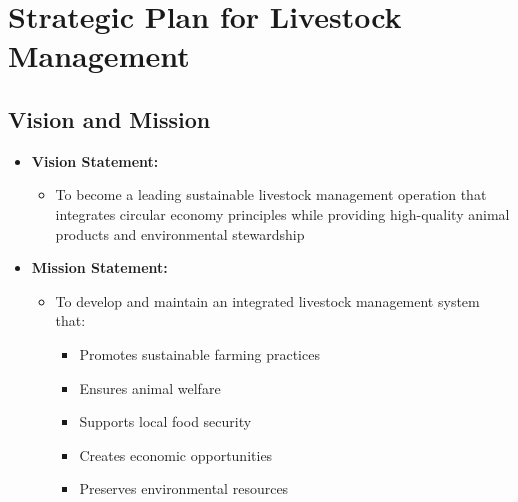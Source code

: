 \section{Strategic Plan for Livestock Management}

\subsection{Vision and Mission}
\begin{itemize}
    \item \textbf{Vision Statement:}
    \begin{itemize}
        \item To become a leading sustainable livestock management operation that integrates circular economy principles while providing high-quality animal products and environmental stewardship
    \end{itemize}
    
    \item \textbf{Mission Statement:}
    \begin{itemize}
        \item To develop and maintain an integrated livestock management system that:
        \begin{itemize}
            \item Promotes sustainable farming practices
            \item Ensures animal welfare
            \item Supports local food security
            \item Creates economic opportunities
            \item Preserves environmental resources
        \end{itemize}
    \end{itemize}
\end{itemize}

